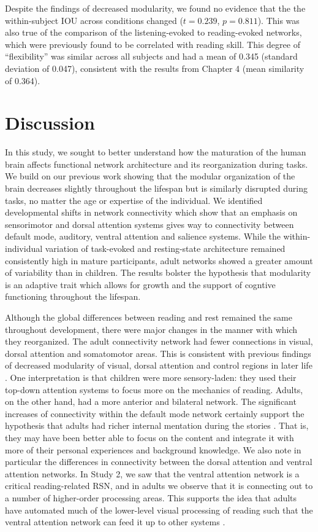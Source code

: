 Despite the findings of decreased modularity, we found no evidence that the the within-subject IOU across conditions changed ($t = 0.239$, $p = 0.811$). This was also true of the comparison of the listening-evoked to reading-evoked networks, which were previously found to be correlated with reading skill. This degree of ``flexibility'' was similar across all subjects and had a mean of 0.345 (standard deviation of 0.047), consistent with the results from Chapter 4 (mean similarity of 0.364).


\section{Discussion}

In this study, we sought to better understand how the maturation of the human brain affects functional network architecture and its reorganization during tasks. We build on our previous work showing that the modular organization of the brain decreases slightly throughout the lifespan but is similarly disrupted during tasks, no matter the age or expertise of the individual. We identified developmental shifts in network connectivity which show that an emphasis on sensorimotor and dorsal attention systems gives way to connectivity between default mode, auditory, ventral attention and salience systems. While the within-individual variation of task-evoked and resting-state architecture remained consistently high in mature participants, adult networks showed a greater amount of variability than in children. The results bolster the hypothesis that modularity is an adaptive trait which allows for growth and the support of cogntive functioning throughout the lifespan.

Although the global differences between reading and rest remained the same throughout development, there were major changes in the manner with which they reorganized. The adult connectivity network had fewer connections in visual, dorsal attention and somatomotor areas. This is consistent with previous findings of decreased modularity of visual, dorsal attention and control regions in later life \citep{Betzel2014}.  One interpretation is that children were more sensory-laden: they used their top-down attention systems to focus more on the mechanics of reading. Adults, on the other hand, had a more anterior and bilateral network. The significant increases of connectivity within the default mode network certainly support the hypothesis that adults had richer internal mentation during the stories \citep{Spreng2013}. That is, they may have been better able to focus on the content and integrate it with more of their personal experiences and background knowledge. We also note in particular the differences in connectivity between the dorsal attention and ventral attention networks. In Study 2, we saw that the ventral attention network is a critical reading-related RSN, and in adults we observe that it is connecting out to a number of higher-order processing areas. This supports the idea that adults have automated much of the lower-level visual processing of reading such that the ventral attention network can feed it up to other systems \citep{Twomey2011}.

